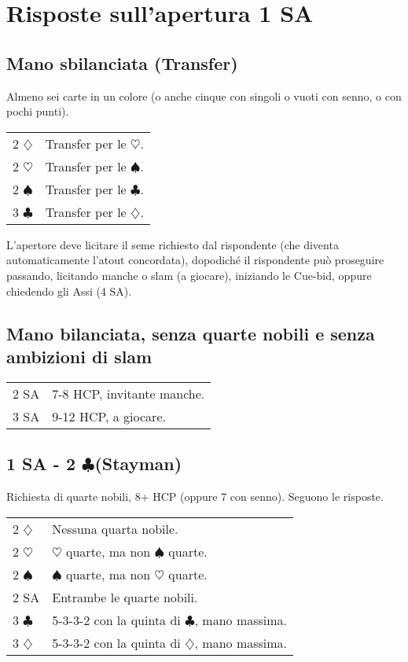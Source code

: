 \documentclass[a4paper,10pt]{article}
\renewcommand{\c}{$\clubsuit$\xspace}
\renewcommand{\d}{$\diamondsuit$\xspace}
\newcommand{\h}{$\heartsuit$\xspace}
\newcommand{\s}{$\spadesuit$\xspace}
\newcommand{\sa}{SA\xspace}
\newcommand{\smallspace}{\vskip0.3cm}
\newenvironment{twocol}
  {\smallspace\noindent\begin{tabular}{l p{0.78\textwidth}}}
  {\end{tabular}\smallspace}
\begin{document}
\pagebreak

\section{Risposte sull'apertura 1 SA}

\subsection{Mano sbilanciata (Transfer)}

Almeno sei carte in un colore (o anche cinque con singoli o vuoti con senno, o con pochi punti).

\begin{twocol}
 2 \d & Transfer per le \h.\\
 2 \h & Transfer per le \s.\\
 2 \s & Transfer per le \c.\\
 3 \c & Transfer per le \d.\\
\end{twocol}

L'apertore deve licitare il seme richiesto dal rispondente (che diventa automaticamente l'atout concordata), dopodiché il rispondente può proseguire passando, licitando manche o slam (a giocare), iniziando le Cue-bid, oppure chiedendo gli Assi (4 \sa).


\subsection{Mano bilanciata, senza quarte nobili e senza ambizioni di slam}

\begin{twocol}
 2 \sa & 7-8 HCP, invitante manche.\\
 3 \sa & 9-12 HCP, a giocare.
\end{twocol}


\subsection{1 SA - 2 \c (Stayman)}

Richiesta di quarte nobili, 8+ HCP (oppure 7 con senno). Seguono le risposte.

\begin{twocol}
	2 \d & Nessuna quarta nobile. \\
	2 \h & \h quarte, ma non \s quarte. \\
	2 \s & \s quarte, ma non \h quarte. \\
	2 \sa & Entrambe le quarte nobili. \\
	3 \c & 5-3-3-2 con la quinta di \c, mano massima. \\
	3 \d & 5-3-3-2 con la quinta di \d, mano massima. \\
\end{twocol}
\end{document}
